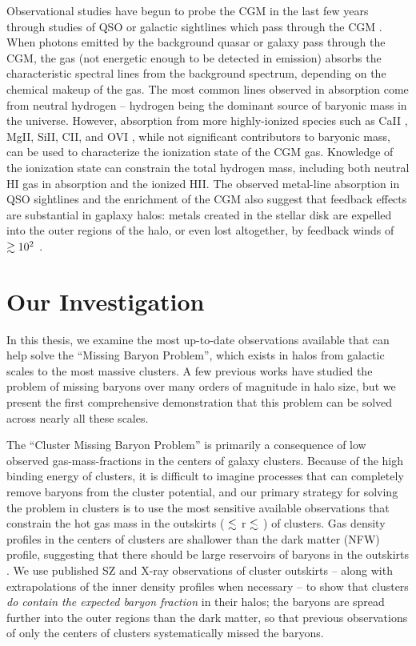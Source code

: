 Observational studies have begun to probe the CGM in the last few
years through studies of QSO or galactic sightlines which pass through
the CGM \citep{Steidel2010, Prochaska2011, Tumlinson2011,
  Werk2013}. When photons emitted by the background quasar or galaxy
pass through the CGM, the gas (not energetic enough to be detected in
emission) absorbs the characteristic spectral lines from the
background spectrum, depending on the chemical makeup of the gas. The
most common lines observed in absorption come from neutral hydrogen --
hydrogen being the dominant source of baryonic mass in the
universe. However, absorption from more highly-ionized species such as
CaII \citep{Zhu2013}, MgII, SiII, CII, and OVI \citep{Tumlinson2011,
  Werk2014}, while not significant contributors to baryonic mass, can
be used to characterize the ionization state of the CGM gas. Knowledge
of the ionization state can constrain the total hydrogen mass,
including both neutral HI gas in absorption and the ionized HII. The
observed metal-line absorption in QSO sightlines and the enrichment of
the CGM also suggest that feedback effects are substantial in gaplaxy
halos: metals created in the stellar disk are expelled into the outer
regions of the halo, or even lost altogether, by feedback winds of
$\gtrsim 10^2$ \kms{} \citep{D'Odorico1991, Chen2010, Oppenheimer2012,
  Booth2012}.

\section{Our Investigation}
\label{sec:investigation}

In this thesis, we examine the most up-to-date observations available
that can help solve the ``Missing Baryon Problem'', which exists in
halos from galactic scales to the most massive clusters. A few
previous works  have studied the problem of
missing baryons over many orders of magnitude in halo size, but we
present the first comprehensive demonstration that this problem can be
solved across nearly all these scales.

The ``Cluster Missing Baryon Problem'' is primarily a
consequence of low observed gas-mass-fractions in the centers of
galaxy clusters. Because of the high binding energy of clusters, it is
difficult to imagine processes that can completely remove baryons from
the cluster potential, and our primary strategy for solving the
problem in clusters is to use the most sensitive available
observations that constrain the hot gas mass in the outskirts
(\rfive{} $\lesssim$ r $\lesssim$ \rvir{}) of clusters. Gas density
profiles in the centers of clusters are shallower than the dark matter
(NFW) profile, suggesting that there should be large reservoirs of
baryons in the outskirts . We use published SZ and
X-ray observations of cluster outskirts -- along with extrapolations
of the inner density profiles when necessary -- to show that clusters
\textit{do contain the expected baryon fraction} in their halos; the
baryons are spread further into the outer regions than the dark
matter, so that previous observations of only the centers of clusters
systematically missed the baryons.

